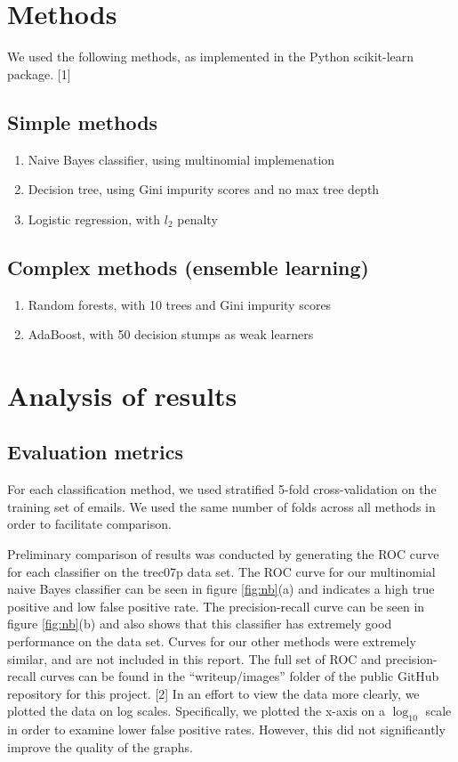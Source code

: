 \documentclass{article} %
\begin{document}
\section{Methods}
We used the following methods, as implemented in the Python scikit-learn package. [1]
\subsection{Simple methods}
\begin{enumerate}
  \item Naive Bayes classifier, using multinomial implemenation
  \item Decision tree, using Gini impurity scores and no max tree depth
  \item Logistic regression, with $l_2$ penalty
\end{enumerate}

\subsection{Complex methods (ensemble learning)}
\begin{enumerate}
  \item Random forests, with 10 trees and Gini impurity scores 
  \item AdaBoost, with 50 decision stumps as weak learners
\end{enumerate}

\section{Analysis of results}
\subsection{Evaluation metrics}
For each classification method, we used stratified 5-fold cross-validation on the training set of emails. We used the same number of folds across all methods in order to facilitate comparison.

Preliminary comparison of results was conducted by generating the ROC curve for each classifier on the trec07p data set. The ROC curve for our multinomial naive Bayes classifier can be seen in figure \ref{fig:nb}(a) and indicates a high true positive and low false positive rate. The precision-recall curve can be seen in figure \ref{fig:nb}(b) and also shows that this classifier has extremely good performance on the data set. Curves for our other methods were extremely similar, and are not included in this report. The full set of ROC and precision-recall curves can be found in the ``writeup/images'' folder of the public GitHub repository for this project. [2] In an effort to view the data more clearly, we plotted the data on log scales. Specifically, we plotted the x-axis on a $\log_{10}$ scale in order to examine lower false positive rates. However, this did not significantly improve the quality of the graphs.
\end{document}
